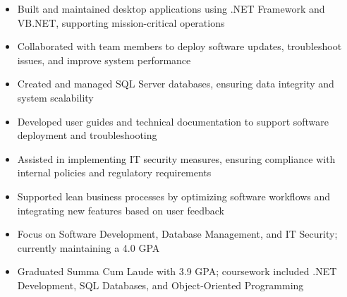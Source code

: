 \par\smallskip
\noindent
\begin{minipage}{20cm}
  \begin{minipage}{9.75cm}
    \begin{itemize}
      \item Built and maintained desktop applications using .NET Framework and VB.NET, supporting mission-critical operations
      \item Collaborated with team members to deploy software updates, troubleshoot issues, and improve system performance
      \item Created and managed SQL Server databases, ensuring data integrity and system scalability
    \end{itemize}
  \end{minipage}
  \hfill
  \begin{minipage}{9.75cm}
    \begin{itemize}
      \item Developed user guides and technical documentation to support software deployment and troubleshooting
      \item Assisted in implementing IT security measures, ensuring compliance with internal policies and regulatory requirements
      \item Supported lean business processes by optimizing software workflows and integrating new features based on user feedback
    \end{itemize}
  \end{minipage}
\end{minipage}

\begin{itemize}
  \item Focus on Software Development, Database Management, and IT Security; currently maintaining a 4.0 GPA
\end{itemize}
\divider

\begin{itemize}
  \item Graduated Summa Cum Laude with 3.9 GPA; coursework included .NET Development, SQL Databases, and Object-Oriented Programming
\end{itemize}

\noindent
\begin{minipage}{20cm}
      
     
     
     
\end{minipage}


